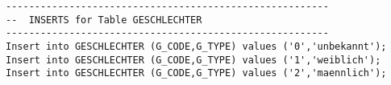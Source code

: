 \documentclass{scrartcl}
\begin{document}
\begin{lstlisting}
--------------------------------------------------------
--  INSERTS for Table GESCHLECHTER
--------------------------------------------------------
Insert into GESCHLECHTER (G_CODE,G_TYPE) values ('0','unbekannt');
Insert into GESCHLECHTER (G_CODE,G_TYPE) values ('1','weiblich');
Insert into GESCHLECHTER (G_CODE,G_TYPE) values ('2','maennlich');
\end{lstlisting}
\end{document}
